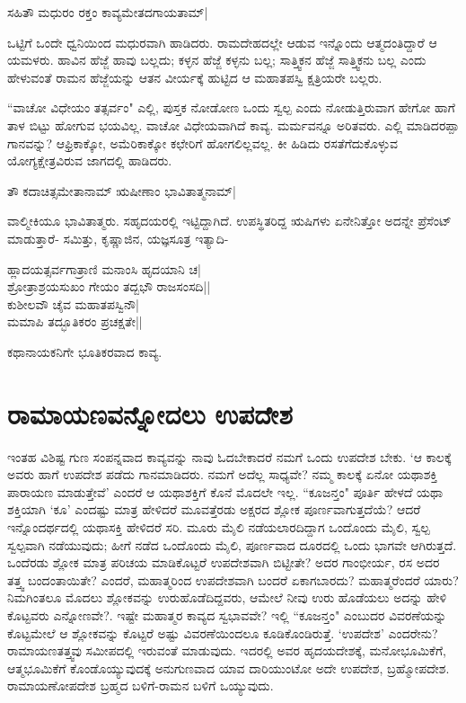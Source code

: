 \begin{shloka} 
ಸಹಿತೌ ಮಧುರಂ ರಕ್ತಂ ಕಾವ್ಯಮೇತದಗಾಯತಾಮ್‍|
\end{shloka}

ಒಟ್ಟಿಗೆ ಒಂದೇ ಧ್ವನಿಯಿಂದ ಮಧುರವಾಗಿ ಹಾಡಿದರು. ರಾಮದೇಹದಲ್ಲೇ ಆಡುವ ಇನ್ನೊಂದು ಆತ್ಮದಂತಿದ್ದಾರೆ ಆ ಯಮಳರು. ಹಾವಿನ ಹೆಜ್ಜೆ ಹಾವು ಬಲ್ಲದು; ಕಳ್ಳನ ಹೆಜ್ಜೆ ಕಳ್ಳನು ಬಲ್ಲ; ಸಾತ್ತ್ವಿಕನ ಹೆಜ್ಜೆ ಸಾತ್ತ್ವಿಕನು ಬಲ್ಲ ಎಂದು ಹೇಳುವಂತೆ ರಾಮನ ಹೆಜ್ಜೆಯನ್ನು ಆತನ ವೀರ್ಯಕ್ಕೆ ಹುಟ್ಟಿದ ಆ ಮಹಾತಪಸ್ವಿ ಕ್ಷತ್ರಿಯರೇ ಬಲ್ಲರು. 

``ವಾಚೋ ವಿಧೇಯಂ ತತ್ಸರ್ವಂ" ಎಲ್ಲಿ, ಪುಸ್ತಕ ನೋಡೋಣ ಒಂದು ಸ್ವಲ್ಪ ಎಂದು ನೋಡುತ್ತಿರುವಾಗ ಹೇಗೋ ಹಾಗೆ ತಾಳ ಬಿಟ್ಟು ಹೋಗುವ ಭಯವಿಲ್ಲ. ವಾಚೋ ವಿಧೇಯವಾಗಿದೆ ಕಾವ್ಯ. ಮರ್ಮವನ್ನೂ ಅರಿತವರು. ಎಲ್ಲಿ ಮಾಡಿದರಪ್ಪಾ ಗಾನವನ್ನು? ಆಫ್ರಿಕಾಕ್ಕೋ, ಅಮೆರಿಕಾಕ್ಕೋ ಕಛೇರಿಗೆ ಹೋಗಲಿಲ್ಲವಲ್ಲ. ಕೀ ಹಿಡಿದು ರಸತೆಗೆದುಕೊಳ್ಳುವ ಯೋಗ್ಯಕ್ಷೇತ್ರವಿರುವ ಜಾಗದಲ್ಲಿ ಹಾಡಿದರು. 

\begin{shloka} 
ತೌ ಕದಾಚಿತ್ಸಮೇತಾನಾಮ್‍ ಋಷೀಣಾಂ ಭಾವಿತಾತ್ಮನಾಮ್‍| \label{189}
\end{shloka}

ವಾಲ್ಮೀಕಿಯೂ ಭಾವಿತಾತ್ಮರು. ಸಹೃದಯರಲ್ಲಿ ಇಟ್ಟಿದ್ದಾಗಿದೆ. ಉಪಸ್ಥಿತರಿದ್ದ ಋಷಿಗಳು ಏನೇನಿತ್ತೋ ಅದನ್ನೇ ಪ್ರೆಸೆಂಟ್‍ ಮಾಡುತ್ತಾರೆ- ಸಮಿತ್ತು, ಕೃಷ್ಣಾಜಿನ, ಯಜ್ಞಸೂತ್ರ ಇತ್ಯಾದಿ- 

\begin{shloka}
ಹ್ಲಾದಯತ್ಸರ್ವಗಾತ್ರಾಣಿ ಮನಾಂಸಿ ಹೃದಯಾನಿ ಚ|\\ 
ಶ್ರೋತ್ರಾಶ್ರಯಸುಖಂ ಗೇಯಂ ತದ್ಬಭೌ ರಾಜಸಂಸದಿ||\\ 
ಕುಶೀಲವೌ ಚೈವ ಮಹಾತಪಸ್ವಿನೌ|\\ 
ಮಮಾಪಿ ತದ್ಭೂತಿಕರಂ ಪ್ರಚಕ್ಷತೇ||
\end{shloka}

ಕಥಾನಾಯಕನಿಗೇ ಭೂತಿಕರವಾದ ಕಾವ್ಯ. 

\section*{ರಾಮಾಯಣವನ್ನೋದಲು ಉಪದೇಶ}

ಇಂತಹ ವಿಶಿಷ್ಟ ಗುಣ ಸಂಪನ್ನವಾದ ಕಾವ್ಯವನ್ನು ನಾವು ಓದಬೇಕಾದರೆ ನಮಗೆ ಒಂದು ಉಪದೇಶ ಬೇಕು. `ಆ ಕಾಲಕ್ಕೆ ಅವರು ಹಾಗೆ ಉಪದೇಶ ಪಡೆದು ಗಾನಮಾಡಿದರು. ನಮಗೆ ಅದೆಲ್ಲ ಸಾಧ್ಯವೇ? ನಮ್ಮ ಕಾಲಕ್ಕೆ ಏನೋ ಯಥಾಶಕ್ತಿ ಪಾರಾಯಣ ಮಾಡುತ್ತೇವೆ' ಎಂದರೆ ಆ ಯಥಾಶಕ್ತಿಗೆ ಕೊನೆ ಮೊದಲೇ ಇಲ್ಲ. ``ಕೂಜನ್ತಂ" ಪೂರ್ತಿ ಹೇಳದೆ ಯಥಾ ಶಕ್ತಿಯಾಗಿ `ಕೂ' ಎಂದಷ್ಟು ಮಾತ್ರ ಹೇಳಿದರೆ ಮೂವತ್ತೆರಡು ಅಕ್ಷರದ ಶ್ಲೋಕ ಪೂರ್ಣವಾಗುತ್ತದೆಯೆ? ಆದರೆ ಇನ್ನೊಂದರ್ಥದಲ್ಲಿ ಯಥಾಸಕ್ತಿ ಹೇಳಿದರೆ ಸರಿ. ಮೂರು ಮೈಲಿ ನಡೆಯಲಾರದಿದ್ದಾಗ ಒಂದೊಂದು ಮೈಲಿ, ಸ್ವಲ್ಪ ಸ್ವಲ್ಪವಾಗಿ ನಡೆಯುವುದು; ಹೀಗೆ ನಡೆದ ಒಂದೊಂದು ಮೈಲಿ, ಪೂರ್ಣವಾದ ದೂರದಲ್ಲಿ ಒಂದು ಭಾಗವೇ ಆಗಿರುತ್ತದೆ. ಒಂದೆರಡು ಶ್ಲೋಕ ಮಾತ್ರ ಪರಿಚಯ ಮಾಡಿಕೊಟ್ಟರೆ ಉಪದೇಶವಾಗಿ ಬಿಟ್ಟೀತೇ? ಅದರ ಗಾಂಭೀರ್ಯ, ರಸ ಅದರ ತತ್ತ್ವ ಬಂದಂತಾಯಿತೇ? ಎಂದರೆ, ಮಹಾತ್ಮರಿಂದ ಉಪದೇಶವಾಗಿ ಬಂದರೆ ಏಕಾಗಬಾರದು? ಮಹಾತ್ಮರೆಂದರೆ ಯಾರು? ನಿಮಗಿಂತಲೂ ಮೊದಲು ಶ್ಲೋಕವನ್ನು ಉರುಹೊಡೆದಿದ್ದವರು, ಆಮೇಲೆ ನೀವು ಉರು ಹೊಡೆಯಲು ಅದನ್ನು ಹೇಳಿ ಕೊಟ್ಟವರು ಎನ್ನೋಣವೇ?. ಇಷ್ಟೇ ಮಹಾತ್ಮರ ಕಾವ್ಯದ ಸ್ವಭಾವವೇ? ಇಲ್ಲಿ ``ಕೂಜನ್ತಂ" ಎಂಬುದರ ವಿವರಣೆಯನ್ನು ಕೊಟ್ಟಮೇಲೆ ಆ ಶ್ಲೋಕವನ್ನು ಕೊಟ್ಟರೆ ಅಷ್ಟು ವಿವರಣೆಯಿಂದಲೂ ಕೂಡಿಕೊಂಡಿರುತ್ತೆ. `ಉಪದೇಶ' ಎಂದರೇನು? ರಾಮಾಯಣತತ್ತ್ವವು ಸಮೀಪದಲ್ಲಿ ಇರುವಂತೆ ಮಾಡುವುದು. ಇದರಲ್ಲಿ ಅವರ ಹೃದಯದೇಶಕ್ಕೆ, ಮನೋಭೂಮಿಕೆಗೆ, ಆತ್ಮಭೂಮಿಕೆಗೆ ಕೊಂಡೊಯ್ಯುವುದಕ್ಕೆ ಅನುಗುಣವಾದ ಯಾವ ದಾರಿಯುಂಟೋ ಅದೇ ಉಪದೇಶ, ಬ್ರಹ್ಮೋಪದೇಶ. ರಾಮಾಯಣೋಪದೇಶ ಬ್ರಹ್ಮದ ಬಳಿಗೆ-ರಾಮನ ಬಳಿಗೆ ಒಯ್ಯುವುದು. 
